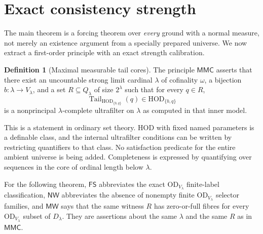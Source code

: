 \documentclass[11pt,letterpaper]{article}
\theoremstyle{definition}
\newtheorem{definition}{Definition}[section]
\numberwithin{equation}{section}
\newcommand{\HOD}{\mathrm{HOD}}
\newcommand{\OD}{\mathrm{OD}}
\newcommand{\tail}{\operatorname{Tail}}
\newcommand{\MMC}{\mathsf{MMC}}
\newcommand{\FS}{\mathsf{FS}}
\newcommand{\NW}{\mathsf{NW}}
\newcommand{\MW}{\mathsf{MW}}
\begin{document}
\section{Exact consistency strength}\label{sec:consistency}

The main theorem is a forcing theorem over \emph{every} ground with a normal measure, not merely an existence argument from a specially prepared universe. We now extract a first-order principle with an exact strength calibration.

\begin{definition}[Maximal measurable tail cores]\label{def:mmc}
The principle $\MMC$ asserts that there exist an uncountable strong limit cardinal $\lambda$ of cofinality $\omega$, a bijection $b:\lambda\to V_\lambda$, and a set $R\subseteq Q_\lambda$ of size $2^\lambda$ such that for every $q\in R$,
\[
\tail_{\HOD_{\{b,q\}}}(q)\in\HOD_{\{b,q\}}
\]
is a nonprincipal $\lambda$-complete ultrafilter on $\lambda$ as computed in that inner model.
\end{definition}

This is a statement in ordinary set theory. HOD with fixed named parameters is a definable class, and the internal ultrafilter conditions can be written by restricting quantifiers to that class. No satisfaction predicate for the entire ambient universe is being added. Completeness is expressed by quantifying over sequences in the core of ordinal length below $\lambda$.

For the following theorem, $\FS$ abbreviates the exact $\OD_{V_\lambda}$ finite-label classification, $\NW$ abbreviates the absence of nonempty finite $\OD_{V_\lambda}$ selector families, and $\MW$ says that the same witness $R$ has zero-or-full fibres for every $\OD_{V_\lambda}$ subset of $D_\lambda$. They are assertions about the same $\lambda$ and the same $R$ as in $\MMC$.
\end{document}
